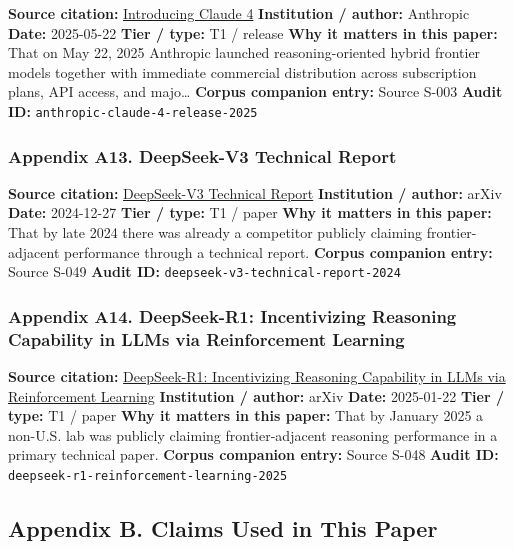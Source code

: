 \documentclass[
  american,
  11pt,
  letterpaper,
]{article}
\begin{document}
\textbf{Source citation:}
\href{https://www.anthropic.com/news/claude-4}{Introducing Claude 4}
\textbf{Institution / author:} Anthropic \textbf{Date:} 2025-05-22
\textbf{Tier / type:} T1 / release \textbf{Why it matters in this
paper:} That on May 22, 2025 Anthropic launched reasoning-oriented
hybrid frontier models together with immediate commercial distribution
across subscription plans, API access, and majo\ldots{} \textbf{Corpus
companion entry:} Source S-003 \textbf{Audit ID:}
\texttt{anthropic-claude-4-release-2025}

\subsubsection{Appendix A13. DeepSeek-V3 Technical
Report}\label{appendix-a13-deepseek-v3-technical-report}

\textbf{Source citation:}
\href{https://arxiv.org/abs/2412.19437}{DeepSeek-V3 Technical Report}
\textbf{Institution / author:} arXiv \textbf{Date:} 2024-12-27
\textbf{Tier / type:} T1 / paper \textbf{Why it matters in this paper:}
That by late 2024 there was already a competitor publicly claiming
frontier-adjacent performance through a technical report. \textbf{Corpus
companion entry:} Source S-049 \textbf{Audit ID:}
\texttt{deepseek-v3-technical-report-2024}

\subsubsection{Appendix A14. DeepSeek-R1: Incentivizing Reasoning
Capability in LLMs via Reinforcement
Learning}\label{appendix-a14-deepseek-r1-incentivizing-reasoning-capability-in-llms-via-reinforcement-learning}

\textbf{Source citation:}
\href{https://arxiv.org/abs/2501.12948}{DeepSeek-R1: Incentivizing
Reasoning Capability in LLMs via Reinforcement Learning}
\textbf{Institution / author:} arXiv \textbf{Date:} 2025-01-22
\textbf{Tier / type:} T1 / paper \textbf{Why it matters in this paper:}
That by January 2025 a non-U.S. lab was publicly claiming
frontier-adjacent reasoning performance in a primary technical paper.
\textbf{Corpus companion entry:} Source S-048 \textbf{Audit ID:}
\texttt{deepseek-r1-reinforcement-learning-2025}

\subsection{Appendix B. Claims Used in This
Paper}\label{appendix-b.-claims-used-in-this-paper}
\end{document}
